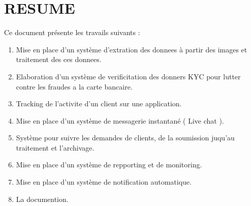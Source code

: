 \documentclass[a4paper, 12pt]{report}
\begin{document}
	\chapter*{RESUME} \label{chap:1Resumé}
	Ce document présente les travails suivants :
	\begin{enumerate}
		\item Mise en place d’un système d’extration des donnees à partir des images et traitement des ces donnees.
		\item Elaboration d’un système de verificitation des donners KYC pour lutter contre les fraudes a la carte bancaire.
		\item Tracking de l’activite d’un client sur une application.
		\item Mise en place d’un système de messagerie instantané ( Live chat ).
		\item Système pour suivre les demandes de clients, de la soumission juqu’au traitement et l’archivage.
		\item Mise en place d’un système de repporting et de monitoring.
		\item Mise en place d’un système de notification automatique.
		\item La documention.
	\end{enumerate}
	\thispagestyle{empty}
\end{document}
